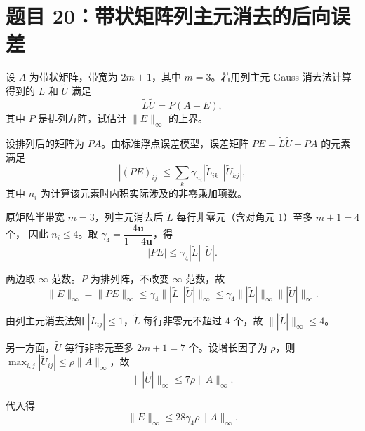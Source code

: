 \documentclass{article}
\begin{document}
\section{题目 20：带状矩阵列主元消去的后向误差}

设 $A$ 为带状矩阵，带宽为 $2m+1$，其中 $m = 3$。若用列主元 Gauss 消去法计算得到的 $\tilde L$ 和
$\tilde U$ 满足
\[
  \tilde L\tilde U = P(A+E),
\]
其中 $P$ 是排列方阵，试估计 $\|E\|_\infty$ 的上界。

\begin{solution}

  设排列后的矩阵为 $PA$。由标准浮点误差模型，误差矩阵 $PE = \tilde{L}\tilde{U} - PA$ 的元素满足
  \[
    | (PE)_{ij} | \le \sum_{k} \gamma_{n_i} |\tilde{L}_{ik}|\,|\tilde{U}_{kj}|,
  \]
  其中 $n_i$ 为计算该元素时内积实际涉及的非零乘加项数。

  原矩阵半带宽 $m=3$，列主元消去后 $\tilde{L}$ 每行非零元（含对角元 1）至多 $m+1=4$ 个，
  因此 $n_i \le 4$。取 $\gamma_4 = \dfrac{4\mathbf{u}}{1-4\mathbf{u}}$，得
  \[
    |PE| \le \gamma_4 |\tilde{L}|\,|\tilde{U}|.
  \]

  两边取 $\infty$-范数。$P$ 为排列阵，不改变 $\infty$-范数，故
  \[
    \|E\|_\infty = \|PE\|_\infty \le \gamma_4 \big\|
    |\tilde{L}|\,|\tilde{U}| \big\|_\infty
    \le \gamma_4 \| |\tilde{L}| \|_\infty \| |\tilde{U}| \|_\infty.
  \]

  由列主元消去法知 $|\tilde{L}_{ij}| \le 1$，$\tilde L$ 每行非零元不超过 $4$ 个，故
  $\| |\tilde{L}| \|_\infty \le 4$。

  另一方面，$\tilde U$ 每行非零元至多 $2m+1=7$ 个。设增长因子为 $\rho$，则
  $\max_{i,j} |\tilde{U}_{ij}| \le \rho \|A\|_\infty$，故
  \[
    \| |\tilde{U}| \|_\infty \le 7\rho\|A\|_\infty.
  \]

  代入得
  \[
    \|E\|_\infty \le 28\gamma_4 \rho \|A\|_\infty.
  \]

\end{solution}
\end{document}
